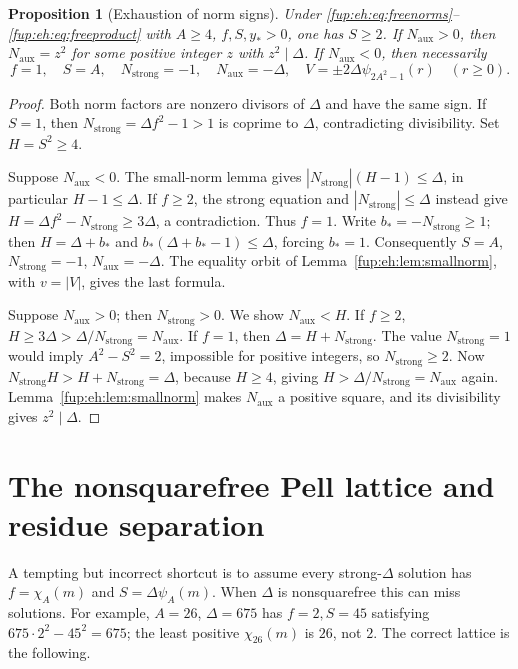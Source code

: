 \documentclass[11pt,letterpaper]{article}
\newtheorem{proposition}[theorem]{Proposition}
\theoremstyle{definition}\newtheorem{definition}[theorem]{Definition}
\theoremstyle{remark}\newtheorem{remark}[theorem]{Remark}
\newcommand{\D}{\Delta}
\newcommand{\Na}{N_{\mathrm{aux}}}\newcommand{\Nk}{N_{\mathrm{index}}}\newcommand{\Nt}{N_{\mathrm{transport}}}
\newcommand{\Ns}{N_{\mathrm{strong}}}
\begin{document}
\begin{proposition}[Exhaustion of norm signs]\label{fup:eh:prop:signs}
Under \eqref{fup:eh:eq:freenorms}--\eqref{fup:eh:eq:freeproduct} with $A\ge4$,
$f,S,y_*>0$, one has $S\ge2$. If $\Na>0$, then
$\Na=z^2$ for some positive integer $z$ with $z^2\mid\D$.
If $\Na<0$, then necessarily
\begin{equation}\label{fup:eh:eq:negativebranch}
 f=1,\quad S=A,\quad \Ns=-1,\quad \Na=-\D,\quad
 V=\pm2\D\psi_{2A^2-1}(r)\quad(r\ge0).
\end{equation}
\end{proposition}
\begin{proof}
Both norm factors are nonzero divisors of $\D$ and have the same
sign. If $S=1$, then $\Ns=\D f^2-1>1$ is coprime to $\D$,
contradicting divisibility. Set $H=S^2\ge4$.

Suppose $\Na<0$. The small-norm lemma gives
$|\Ns|(H-1)\le\D$, in particular $H-1\le\D$.
If $f\ge2$, the strong equation and $|\Ns|\le\D$ instead give
$H=\D f^2-\Ns\ge3\D$, a contradiction.
Thus $f=1$. Write $b_*=-\Ns\ge1$; then $H=\D+b_*$ and
$b_*(\D+b_*-1)\le\D$, forcing $b_*=1$.
Consequently $S=A$, $\Ns=-1$, $\Na=-\D$.
The equality orbit of Lemma~\ref{fup:eh:lem:smallnorm}, with $v=|V|$,
gives the last formula.

Suppose $\Na>0$; then $\Ns>0$. We show $\Na<H$.
If $f\ge2$, $H\ge3\D>\D/\Ns=\Na$.
If $f=1$, then $\D=H+\Ns$. The value $\Ns=1$ would imply
$A^2-S^2=2$, impossible for positive integers, so $\Ns\ge2$.
Now $\Ns H>H+\Ns=\D$, because $H\ge4$, giving
$H>\D/\Ns=\Na$ again. Lemma~\ref{fup:eh:lem:smallnorm} makes
$\Na$ a positive square, and its divisibility gives $z^2\mid\D$.
\end{proof}

\section{The nonsquarefree Pell lattice and residue separation}
\label{fup:eh:sec:lattice}
A tempting but incorrect shortcut is to assume every strong-$\D$
solution has $f=\chi_A(m)$ and $S=\D\psi_A(m)$. When $\D$
is nonsquarefree this can miss solutions. For example,
$A=26$, $\D=675$ has $f=2,S=45$ satisfying
$675\cdot2^2-45^2=675$; the least positive $\chi_{26}(m)$
is $26$, not $2$. The correct lattice is the following.
\end{document}
